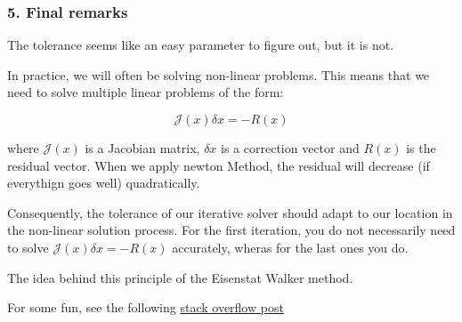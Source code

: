 \begin{frame}
	\frametitle{\textbf{5. Final remarks}}


The tolerance seems like an easy parameter to figure out, but it is not.

In practice, we will often be solving non-linear problems. This means that we need to solve multiple linear problems of the form:

\[
\mathcal{J}(x) \delta x = - R(x)
\]

where $\mathcal{J}(x)$ is a Jacobian matrix, $\delta x$ is a correction vector and $R(x)$ is the residual vector. When we apply newton Method, the residual will decrease (if everythign goes well) quadratically. 

Consequently, the tolerance of our iterative solver should adapt to our location in the non-linear solution process. For the first iteration, you do not necessarily need to solve $\mathcal{J}(x) \delta x = - R(x)$ accurately, wheras for the last ones you do.

The idea behind this principle of the Eisenstat Walker method.

For some fun, see the following \href{https://scicomp.stackexchange.com/questions/33806/understanding-the-eisenstat-walker-method-for-choosing-the-tolerance-of-a-linear}{\color{orange}stack overflow post} 
    
\end{frame}